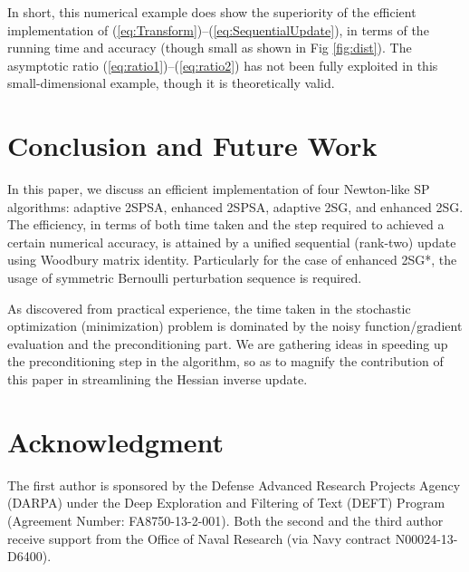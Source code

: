 \documentclass[conference,10.3cpt]{IEEEtran}
\begin{document}
In short, this numerical example does show the superiority of the efficient implementation of (\ref{eq:Transform})--(\ref{eq:SequentialUpdate}), in terms of the running time and accuracy (though small as shown in Fig \ref{fig:dist}). The asymptotic ratio (\ref{eq:ratio1})--(\ref{eq:ratio2}) has not been fully exploited in this small-dimensional example, though it is theoretically valid.


\section{Conclusion and Future Work} In this paper, we discuss
an efficient implementation of four Newton-like SP algorithms:
adaptive 2SPSA, enhanced 2SPSA, adaptive 2SG, and enhanced 2SG. The
efficiency, in terms of both time taken and the step required to achieved a certain numerical accuracy, is
attained by a unified sequential (rank-two) update using Woodbury
matrix identity. Particularly for the case of enhanced 2SG*, the
usage of symmetric Bernoulli perturbation sequence is required.

As discovered from practical experience, the time taken in the
stochastic optimization (minimization) problem is dominated by the
noisy function/gradient evaluation and the preconditioning part. We
are gathering ideas in speeding up the preconditioning step in the
algorithm, so as to magnify the contribution of this paper in
streamlining the Hessian inverse update.

\section*{Acknowledgment} The first author is sponsored by the
Defense Advanced Research Projects Agency (DARPA) under the Deep
Exploration and Filtering of Text (DEFT) Program (Agreement Number:
FA8750-13-2-001). Both the second and the third author receive
support from the Office of Naval Research (via Navy contract
N00024-13-D6400).
\end{document}
